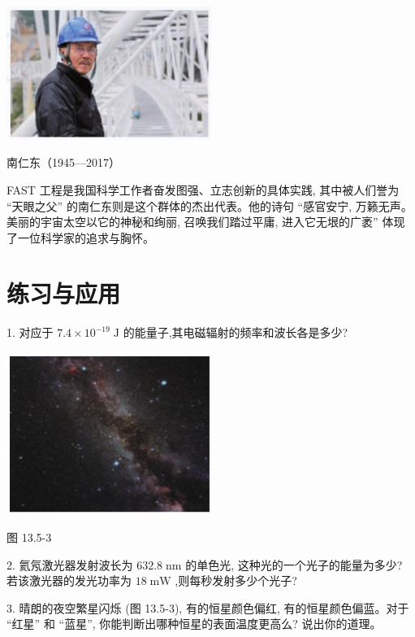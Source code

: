 \documentclass[10pt]{article}
\begin{document}
\begin{center}
\includegraphics[max width=0.5\textwidth]{images/01911d5f-8e38-70c0-b5b8-2b399bd115b6_132_158387.jpg}
\end{center}

南仁东（1945—2017）

FAST 工程是我国科学工作者奋发图强、立志创新的具体实践, 其中被人们誉为 “天眼之父” 的南仁东则是这个群体的杰出代表。他的诗句 “感官安宁, 万籁无声。美丽的宇宙太空以它的神秘和绚丽, 召唤我们踏过平庸, 进入它无垠的广袤” 体现了一位科学家的追求与胸怀。

\section*{练习与应用}

1. 对应于 \({7.4} \times {10}^{-{19}}\mathrm{\;J}\) 的能量子,其电磁辐射的频率和波长各是多少?

\begin{center}
\includegraphics[max width=0.5\textwidth]{images/01911d5f-8e38-70c0-b5b8-2b399bd115b6_133_909726.jpg}
\end{center}

图 13.5-3

2. 氦氖激光器发射波长为 \({632.8}\mathrm{\;{nm}}\) 的单色光, 这种光的一个光子的能量为多少? 若该激光器的发光功率为 \({18}\mathrm{\;{mW}}\) ,则每秒发射多少个光子?

3. 晴朗的夜空繁星闪烁 (图 13.5-3), 有的恒星颜色偏红, 有的恒星颜色偏蓝。对于 “红星” 和 “蓝星”, 你能判断出哪种恒星的表面温度更高么? 说出你的道理。
\end{document}
